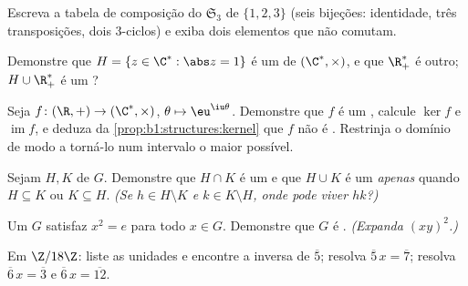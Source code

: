 \begin{exercise}[$\star$]\label{exo:b1:structures:3}
Escreva a tabela de composição do  $\mathfrak{S}_3$
de $\{1,2,3\}$ (seis bijeções: identidade, três transposições, dois
$3$-ciclos) e exiba dois elementos que não comutam.
\end{exercise}

\begin{exercise}[$\star$]\label{exo:b1:structures:4}
Demonstre que $H = \{z \in \C^* : \abs z = 1\}$ é um  de $(\C^*,
\times)$, e que $\R_+^*$ é outro; $H \cup \R_+^*$ é um
?
\end{exercise}

\begin{exercise}[$\star\star$]\label{exo:b1:structures:5}
Seja $f \colon (\R, +) \to (\C^*, \times)$, $\theta \mapsto
\eu^{\iu\theta}$. Demonstre que $f$ é um , calcule $\ker f$ e
$\operatorname{im} f$, e deduza da
\cref{prop:b1:structures:kernel} que $f$ não é . Restrinja
o domínio de modo a torná-lo  num intervalo o maior possível.
\end{exercise}

\begin{exercise}[$\star\star$]\label{exo:b1:structures:6}
Sejam $H, K$  de $G$. Demonstre que $H \cap K$ é um 
e que $H \cup K$ é um  \emph{apenas} quando $H \subseteq K$ ou
$K \subseteq H$. \emph{(Se $h \in H \setminus K$ e $k \in K
\setminus H$, onde pode viver $hk$?)}
\end{exercise}

\begin{exercise}[$\star\star$]\label{exo:b1:structures:7}
Um  $G$ satisfaz $x^2 = e$ para todo $x \in G$. Demonstre que $G$ é
. \emph{(Expanda $(xy)^2$.)}
\end{exercise}

\begin{exercise}[$\star\star$]\label{exo:b1:structures:8}
Em $\Z/18\Z$: liste as unidades e encontre a inversa de $\overline 5$;
resolva $\overline 5\, x = \overline 7$; resolva $\overline 6\, x =
\overline 3$ e $\overline 6\, x = \overline{12}$.
\end{exercise}

